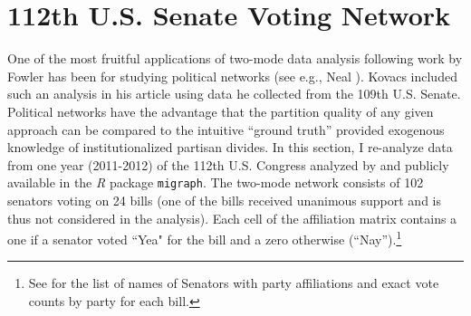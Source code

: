 \documentclass[a4paper,fleqn]{cas-sc}
\begin{document}
\section{112th U.S. Senate Voting Network}
One of the most fruitful applications of two-mode data analysis following work by Fowler \citeyearpar{fowler2006legislative} has been for studying political networks (see e.g., Neal \citeyearpar{neal2014backbone}). Kovacs included such an analysis in his article using data he collected from the 109th U.S. Senate. Political networks have the advantage that the partition quality of any given approach can be compared to the intuitive ``ground truth'' provided exogenous knowledge of institutionalized partisan divides. In this section, I re-analyze data from one year (2011-2012) of the 112th U.S. Congress analyzed by \citet[Chap. 8]{knoke2021multimodal} and publicly available in the \textit{R} package \texttt{migraph}. The two-mode network consists of 102 senators voting on 24 bills (one of the bills received unanimous support and is thus not considered in the analysis). Each cell of the affiliation matrix contains a one if a senator voted ``Yea" for the bill and a zero otherwise (``Nay'').\footnote{See \citet[Appendices 8.1 and 8.2]{knoke2021multimodal} for the list of names of Senators with party affiliations and exact vote counts by party for each bill.} 
\end{document}
